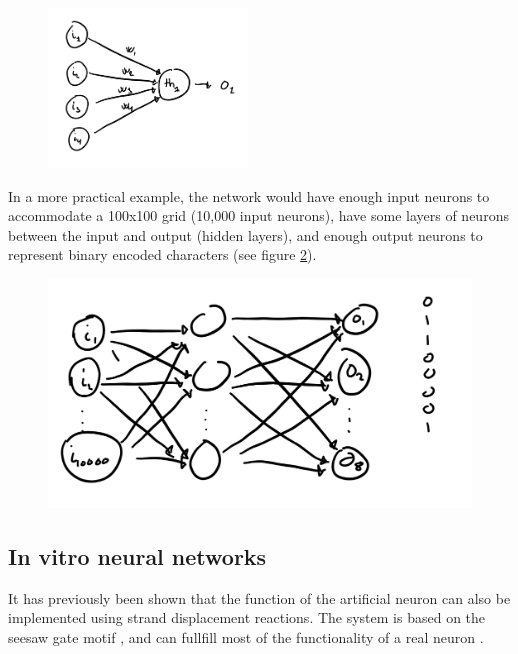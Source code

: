 \begin{figure}[H]
\centering
\includegraphics[width=200]{images/neuralnetwork_neurons.png}
\caption{}
\label{neuralnetwork_neurons}
\end{figure}

 In a more practical example, the network would have enough input neurons to accommodate a 100x100 grid (10,000 input neurons), have some layers of neurons between the input and output (hidden layers), and enough output neurons to represent binary encoded characters (see figure \ref{neuralnetwork_ocr}).

 \begin{figure}[H]
 \centering
 \includegraphics[width=\columnwidth]{images/neuralnetwork_ocr.png}
 \caption{}
 \label{neuralnetwork_ocr}
 \end{figure}

\subsection{In vitro neural networks}
It has previously been shown that the function of the artificial neuron can also be implemented using strand displacement reactions. The system is based on the seesaw gate motif \cite{Qian}, and can fullfill most of the functionality of a real neuron \cite{Qian2011}.

